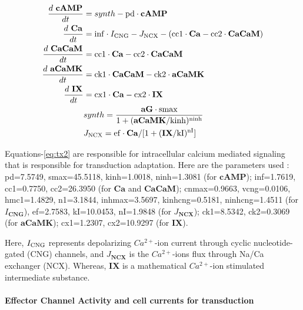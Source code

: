 \documentclass[
]{article}
\begin{document}
\begin{equation}\label{eq:tx2}
\begin{split}
\frac{d\ \mathbf{cAMP}}{dt} &= synth - {\rm pd} \cdot \mathbf{cAMP} \\
\frac{d\ \mathbf{Ca}}{dt} &= {\rm inf}\cdot I_{\rm CNG} - J_{\rm NCX} - ({\rm cc1} \cdot \mathbf{Ca} - {\rm cc2} \cdot \mathbf{CaCaM}) \\
\frac{d\ \mathbf{CaCaM}}{dt} &= {\rm cc1} \cdot \mathbf{Ca} - {\rm cc2} \cdot \mathbf{CaCaM} \\
\frac{d\ \mathbf{aCaMK}}{dt} &= {\rm ck1} \cdot \mathbf{CaCaM} - {\rm ck2} \cdot \mathbf{aCaMK} \\
\frac{d\ \mathbf{IX}}{dt} &= {\rm cx1} \cdot \mathbf{Ca} - {\rm cx2} \cdot \mathbf{IX} \\
& synth = \frac{\mathbf{aG} \cdot {\rm smax}}{1 + (\mathbf{aCaMK} / {\rm kinh} )^{\rm ninh}} \\
& J_{\rm NCX} = {\rm ef}\cdot \mathbf{Ca}/[1+(\mathbf{IX}/{\rm kI})^{\rm nI}] \\
\end{split}
\end{equation}

Equations-\eqref{eq:tx2} are responsible for intracellular calcium mediated signaling that is responsible for transduction adaptation. Here are the parameters used : pd=7.5749, smax=45.5118, kinh=1.0018, ninh=1.3081 (for \(\mathbf{cAMP}\)); inf=1.7619, cc1=0.7750, cc2=26.3950 (for \(\mathbf{Ca}\) and \(\mathbf{CaCaM}\)); cnmax=0.9663, vcng=0.0106, hmc1=1.4829, n1=3.1844, inhmax=3.5697, kinhcng=0.5181, ninhcng=1.4511 (for \(I_\mathbf{CNG}\)), ef=2.7583, kI=10.0453, nI=1.9848 (for \(J_\mathbf{NCX}\)); ck1=8.5342, ck2=0.3069 (for \(\mathbf{aCaMK}\)); cx1=1.2307, cx2=10.9297 (for \(\mathbf{IX}\)).

Here, \(I_{\rm CNG}\) represents depolarizing \(Ca^{2+}\)-ion current through cyclic nucleotide-gated (CNG) channels, and \(J_\mathbf{NCX}\) is the \(Ca^{2+}\)-ions flux through Na/Ca exchanger (NCX). Whereas, \(\mathbf{IX}\) is a mathematical \(Ca^{2+}\)-ion stimulated intermediate substance.

\hypertarget{effector-channel-activity-and-cell-currents-for-transduction}{%
\paragraph*{Effector Channel Activity and cell currents for transduction}\label{effector-channel-activity-and-cell-currents-for-transduction}}
\end{document}
